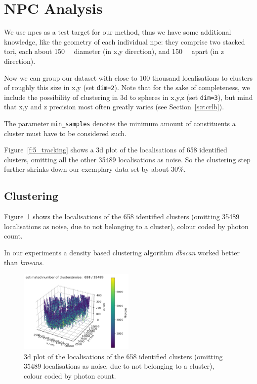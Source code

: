 \documentclass[11pt, a4paper, oneside, twocolumn]{report}
\renewcommand{\tt}{\texttt}
\newcommand{\e}{\emph}
\newcommand{\m}{\mathrm}
\begin{document}
\section{NPC Analysis}\label{s:r:ananpc}

We use \gls{npc}s as a test target for our method, thus we have some
additional knowledge, like the geometry of each individual \gls{npc}:
they comprise two stacked tori, each about \SI{150}{\nano\m} diameter
(in x,y direction), and \SI{150}{\nano\m} apart (in z direction).

Now we can group our dataset with close to 100 thousand localisations
to clusters of roughly this size in x,y (set \tt{dim=2}). Note that
for the sake of completeness, we include the possibility of clustering
in 3d to spheres in x,y,z (set \tt{dim=3}), but mind that x,y and z
precision most often greatly varies (see Section~\ref{s:r:crlb}).

The parameter \tt{min\_samples} denotes the minimum amount of
constituents a cluster must have to be considered such.

Figure~\ref{f:5_tracking} shows a 3d plot of the localisations of 658
identified clusters, omitting all the other 35489 localisations as
noise. So the clustering step further shrinks down our exemplary data
set by about 30\%.


\subsection{Clustering}

Figure~\ref{f:6_clustering} shows the localisations of the 658
identified clusters (omitting 35489 localisations as noise, due to not
belonging to a cluster), colour coded by photon count.

In our experiments a density based clustering algorithm \e{dbscan}
\cite{eks96} worked better than \e{kmeans}.

\begin{figure}[h!]
  \centering
  \includegraphics[width=0.5\textwidth]{6_clustering.png}
  \caption{3d plot of the localisations of the 658 identified clusters
    (omitting 35489 localisations as noise, due to not belonging to a
    cluster), colour coded by photon count.}
  \label{f:6_clustering}
\end{figure}
\end{document}
